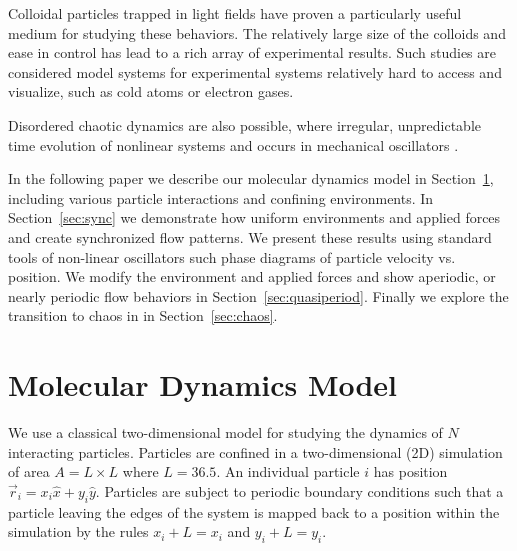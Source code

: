 \documentclass[prb,preprint]{revtex4}
\begin{document}
Colloidal particles trapped in light fields have proven
a particularly useful medium for studying these behaviors.  %
The relatively large size of the colloids
and ease in control has lead to a rich array of 
experimental results. %
Such studies are considered model systems
for experimental systems relatively hard to access and visualize,
such as cold atoms or electron gases. %



Disordered chaotic dynamics are also possible,
where irregular, unpredictable time evolution of
nonlinear systems and occurs in mechanical oscillators \cite{chaos}.

In the following paper we describe
our molecular dynamics model in Section~\ref{sec:MD},
including various particle interactions and confining environments.
In Section~\ref{sec:sync} we
demonstrate how uniform environments and applied forces
and create synchronized flow patterns.
We present these results using standard tools of non-linear oscillators
such phase diagrams of particle velocity vs. position.
We modify the environment and applied forces
and show aperiodic, or nearly periodic flow behaviors
in Section~\ref{sec:quasiperiod}.
Finally we explore the transition to chaos in 
in Section~\ref{sec:chaos}.


\section{Molecular Dynamics Model}
\label{sec:MD}
We use a classical two-dimensional model for 
studying the dynamics of $N$ interacting particles. 
Particles are confined in a two-dimensional (2D) 
simulation of area $A = L \times L$ where $L=36.5$.
An individual particle $i$ has
position $\vec{r}_i = x_i \hat{x} + y_i \hat{y}$.
Particles are subject to
periodic boundary conditions
such that a particle leaving the edges of the system is mapped
back to a position within the simulation 
by the rules $x_i+L=x_i$ and $y_i+L=y_i$.
\end{document}
